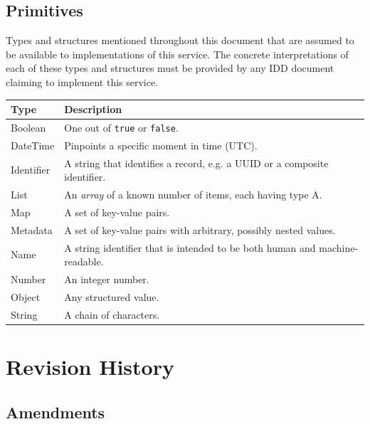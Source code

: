 \documentclass[a4paper]{arrowhead}
\newcommand{\pdef}[1]{{\textcolor{ArrowheadGrey}{#1\label{sec:model:primitives:#1}\label{sec:model:primitives:#1s}\label{sec:model:primitives:#1es}}}}
\begin{document}
\subsection{Primitives}
\label{sec:model:primitives}

Types and structures mentioned throughout this document that are assumed to be available to implementations of this service.
The concrete interpretations of each of these types and structures must be provided by any IDD document claiming to implement this service.

\noindent\begin{tabularx}{\textwidth}{| p{4.6cm} | X |} \hline
\rowcolor{gray!33} Type & Description \\ \hline
\pdef{Boolean} & One out of \texttt{true} or \texttt{false}. \\ \hline
\pdef{DateTime} & Pinpoints a specific moment in time (UTC). \\ \hline
\pdef{Identifier} & A string that identifies a record, e.g. a UUID or a composite identifier. \\ \hline
\pdef{List} & An \textit{array} of a known number of items, each having type A. \\ \hline
\pdef{Map} & A set of key-value pairs. \\ \hline
\pdef{Metadata} & A set of key-value pairs with arbitrary, possibly nested values. \\ \hline
\pdef{Name} & A string identifier that is intended to be both human and machine-readable. \\ \hline
\pdef{Number} & An integer number. \\ \hline
\pdef{Object} & Any structured value. \\ \hline
\pdef{String} & A chain of characters. \\ \hline
\end{tabularx}

\newpage




\newpage

\section{Revision History}
\subsection{Amendments}
\end{document}
